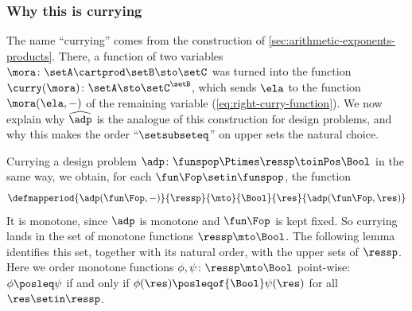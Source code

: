 \subsubsection{Why this is currying}

The name ``currying'' comes from the construction of \cref{sec:arithmetic-exponents-products}.
There, a function of two variables $\mora \colon \setA \cartprod \setB \sto \setC$ was turned into the function $\curry(\mora) \colon \setA \sto \setC^{\setB}$, which sends $\ela$ to the function $\mora(\ela, -)$ of the remaining variable (\cref{eq:right-curry-function}).
We now explain why $\widehat{\adp}$ is the analogue of this construction for design problems, and why this makes the order ``$\setsubseteq$'' on upper sets the natural choice.

Currying a design problem $\adp \colon \funspop \Ptimes \ressp \toinPos \Bool$ in the same way, we obtain, for each $\fun\Fop \setin \funspop$, the function
\begin{equation}
    \defmapperiod{
        \adp(\fun\Fop, -)
    }{
        \ressp
    }{
        \mto
    }{
        \Bool
    }{
        \res
    }{
        \adp(\fun\Fop, \res)
    }
\end{equation}
It is monotone, since $\adp$ is monotone and $\fun\Fop$ is kept fixed.
So currying lands in the set of monotone functions $\ressp \mto \Bool$.
The following lemma identifies this set, together with its natural order, with the upper sets of $\ressp$.
Here we order monotone functions $\phi, \psi \colon \ressp \mto \Bool$ point-wise: $\phi \posleq \psi$ if and only if $\phi(\res) \posleqof{\Bool} \psi(\res)$ for all $\res \setin \ressp$.

